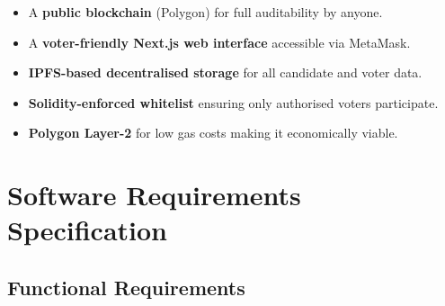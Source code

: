 \documentclass[12pt,a4paper]{report}
\begin{document}
\begin{itemize}
\item A \textbf{public blockchain} (Polygon) for full auditability by anyone.
\item A \textbf{voter-friendly Next.js web interface} accessible via MetaMask.
\item \textbf{IPFS-based decentralised storage} for all candidate and voter data.
\item \textbf{Solidity-enforced whitelist} ensuring only authorised voters participate.
\item \textbf{Polygon Layer-2} for low gas costs making it economically viable.
\end{itemize}

\chapter{Software Requirements Specification}

\section{Functional Requirements}
\end{document}
